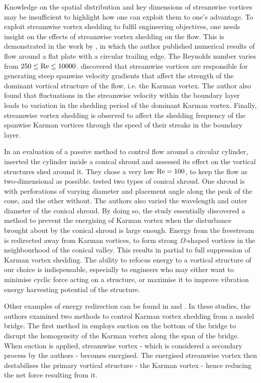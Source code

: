 \documentclass[oneside]{utmthesis}
\begin{document}
Knowledge on the spatial distribution and key dimensions of streamwise vortices may be insufficient to highlight how one can exploit them to one's advantage. To exploit streamwise vortex shedding to fulfil engineering objectives, one needs insight on the effects of streamwise vortex shedding on the flow. This is demonstrated in the work by \citet{Rai2018}, in which the author published numerical results of flow around a flat plate with a circular trailing edge. The Reynolds number varies from $250 \leq \text{Re} \leq 10000$. \citet{Rai2018} discovered that streamwise vortices are responsible for generating steep spanwise velocity gradients that affect the strength of the dominant vortical structure of the flow, i.e. the Karman vortex. The author also found that fluctuations in the streamwise velocity within the boundary layer leads to variation in the shedding period of the dominant Karman vortex. Finally, streamwise vortex shedding is observed to affect the shedding frequency of the spanwise Karman vortices through the speed of their streaks in the boundary layer.

In an evaluation of a passive method to control flow around a circular cylinder, \citet{Lin2018} inserted the cylinder inside a conical shroud and assessed its effect on the vortical structures shed around it. They chose a very low $\text{Re} = 100$, to keep the flow as two-dimensional as possible. \citet{Lin2018} tested two types of conical shroud. One shroud is with perforations of varying diameter and placement angle along the peak of the cone, and the other without. The authors also varied the wavelength and outer diameter of the conical shroud. By doing so, the study essentially discovered a method to prevent the energising of Karman vortex when the disturbance brought about by the conical shroud is large enough. Energy from the freestream is redirected away from Karman vortices, to form strong $\Omega$-shaped vortices in the neighbourhood of the conical valley. This results in partial to full suppression of Karman vortex shedding. The ability to refocus energy to a vortical structure of our choice is indispensable, especially to engineers who may either want to minimise cyclic force acting on a structure, or maximise it to improve vibration energy harvesting potential of the structure.

Other examples of energy redirection can be found in \citet{Zhang2016} and \citet{Zhang2019}. In these studies, the authors examined two methods to control Karman vortex shedding from a model bridge. The first method in \citet{Zhang2016} employs suction on the bottom of the bridge to disrupt the homogeneity of the Karman vortex along the span of the bridge. When suction is applied, streamwise vortex - which is considered a secondary process by the authors - becomes energised. The energised streamwise vortex then destabilises the primary vortical structure - the Karman vortex - hence reducing the net force resulting from it.
\end{document}
